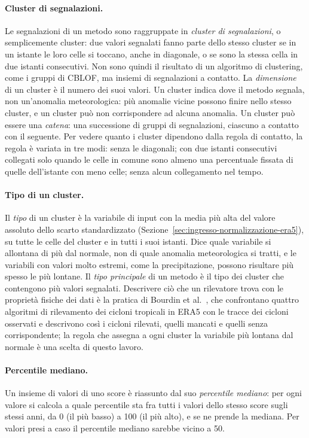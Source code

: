 \paragraph{Cluster di segnalazioni.} Le segnalazioni di un metodo sono raggruppate in \emph{cluster di segnalazioni}, o semplicemente cluster: due valori segnalati fanno parte dello stesso cluster se in un istante le loro celle si toccano, anche in diagonale, o se sono la stessa cella in due istanti consecutivi. Non sono quindi il risultato di un algoritmo di clustering, come i gruppi di CBLOF, ma insiemi di segnalazioni a contatto. La \emph{dimensione} di un cluster è il numero dei suoi valori. Un cluster indica dove il metodo segnala, non un'anomalia meteorologica: più anomalie vicine possono finire nello stesso cluster, e un cluster può non corrispondere ad alcuna anomalia. Un cluster può essere una \emph{catena}: una successione di gruppi di segnalazioni, ciascuno a contatto con il seguente. Per vedere quanto i cluster dipendono dalla regola di contatto, la regola è variata in tre modi: senza le diagonali; con due istanti consecutivi collegati solo quando le celle in comune sono almeno una percentuale fissata di quelle dell'istante con meno celle; senza alcun collegamento nel tempo.

\paragraph{Tipo di un cluster.} Il \emph{tipo} di un cluster è la variabile di input con la media più alta del valore assoluto dello scarto standardizzato (Sezione~\ref{sec:ingresso-normalizzazione-era5}), su tutte le celle del cluster e in tutti i suoi istanti. Dice quale variabile si allontana di più dal normale, non di quale anomalia meteorologica si tratti, e le variabili con valori molto estremi, come la precipitazione, possono risultare più spesso le più lontane. Il \emph{tipo principale} di un metodo è il tipo dei cluster che contengono più valori segnalati. Descrivere ciò che un rilevatore trova con le proprietà fisiche dei dati è la pratica di Bourdin et al.~\cite{bourdin2022tc}, che confrontano quattro algoritmi di rilevamento dei cicloni tropicali in ERA5 con le tracce dei cicloni osservati e descrivono così i cicloni rilevati, quelli mancati e quelli senza corrispondente; la regola che assegna a ogni cluster la variabile più lontana dal normale è una scelta di questo lavoro.

\paragraph{Percentile mediano.} Un insieme di valori di uno score è riassunto dal suo \emph{percentile mediano}: per ogni valore si calcola a quale percentile sta fra tutti i valori dello stesso score sugli stessi anni, da 0 (il più basso) a 100 (il più alto), e se ne prende la mediana. Per valori presi a caso il percentile mediano sarebbe vicino a 50.

